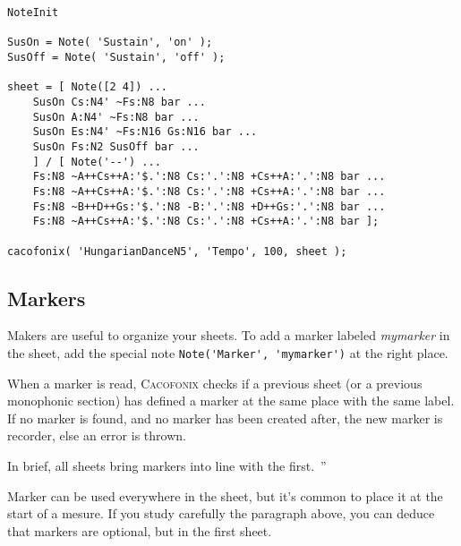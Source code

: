 \documentclass{article}
\newcommand{\cacofonix}{\textsc{Cacofonix}\xspace}
\newenvironment{meenv}{ \par \noindent \makebox[6em][r]{ \textcolor{mecolor}{Me}: `` --~}}{~''}
\newcommand{\me}[1]{\begin{meenv}#1\end{meenv}}
\begin{document}

\begin{lstlisting}
NoteInit

SusOn = Note( 'Sustain', 'on' );
SusOff = Note( 'Sustain', 'off' );

sheet = [ Note([2 4]) ...
	SusOn Cs:N4' ~Fs:N8 bar ...
	SusOn A:N4' ~Fs:N8 bar ...
	SusOn Es:N4' ~Fs:N16 Gs:N16 bar ...
	SusOn Fs:N2 SusOff bar ...
	] / [ Note('--') ...
	Fs:N8 ~A++Cs++A:'$.':N8 Cs:'.':N8 +Cs++A:'.':N8 bar ...
	Fs:N8 ~A++Cs++A:'$.':N8 Cs:'.':N8 +Cs++A:'.':N8 bar ...
	Fs:N8 ~B++D++Gs:'$.':N8 -B:'.':N8 +D++Gs:'.':N8 bar ...
	Fs:N8 ~A++Cs++A:'$.':N8 Cs:'.':N8 +Cs++A:'.':N8 bar ];

cacofonix( 'HungarianDanceN5', 'Tempo', 100, sheet );
\end{lstlisting}

\subsection{Markers}
\label{sec:Markers}

Makers are useful to organize your sheets. To add a marker labeled \emph{mymarker} in the sheet, add the special note \lstinline!Note('Marker', 'mymarker')! at the right place.

When a marker is read, \cacofonix checks if a previous sheet (or a previous monophonic section) has defined a marker at the same place with the same label. If no marker is found, and no marker has been created after, the new marker is recorder, else an error is thrown.
\me{In brief, all sheets bring markers into line with the first.}

Marker can be used everywhere in the sheet, but it's common to place it at the start of a mesure. If you study carefully the paragraph above, you can deduce that markers are optional, but in the first sheet.
\end{document}
